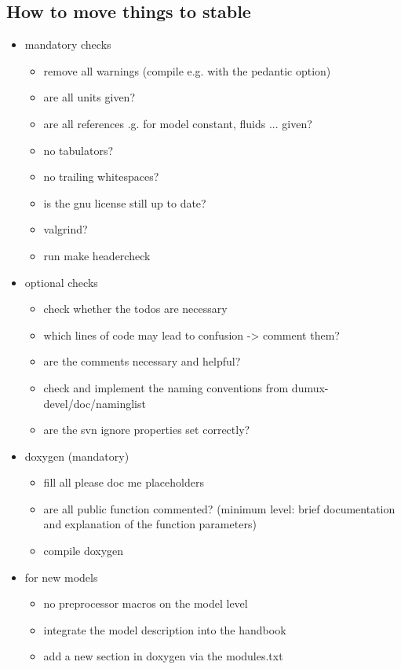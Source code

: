 \subsection{How to move things to stable}
\begin{itemize}
  \item mandatory checks
  \begin{itemize}
    \item remove all warnings (compile e.g. with the pedantic option)
    \item are all units given?
    \item are all references .g. for model constant, fluids ... given?
    \item no tabulators?
    \item no trailing whitespaces?
    \item is the gnu license still up to date?
    \item valgrind?
    \item run make headercheck
  \end{itemize}
  \item optional checks
  \begin{itemize}
    \item check whether the todos are necessary
    \item which lines of code may lead to confusion -> comment them?
    \item are the comments necessary and helpful?
    \item check and implement the naming conventions from dumux-devel/doc/naminglist
    \item are the svn ignore properties set correctly?
  \end{itemize}
  \item doxygen (mandatory)
  \begin{itemize}
    \item fill all please doc me placeholders
    \item are all public function commented? (minimum level: brief documentation and
          explanation of the function parameters)
    \item compile doxygen
  \end{itemize}
  \item for new models
  \begin{itemize}
    \item no preprocessor macros on the model level
    \item integrate the model description into the handbook
    \item add a new section in doxygen via the modules.txt

\end{itemize}
\end{itemize}
